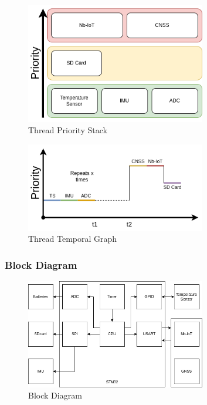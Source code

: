 \begin{figure}[h]
    \centering
    \includegraphics[width=0.7\textwidth]{images/diagrams/threads/thread.drawio.png}  %
    \caption{Thread Priority Stack}
    \label{fig:Thread Priority Stack}        
\end{figure}

\begin{figure}[H]
    \centering
    \includegraphics[width=0.7\textwidth]{images/diagrams/threads/graph/threads_graph.drawio.png}  %
    \caption{Thread Temporal Graph}
    \label{fig:Thread Temporal Graph}        
\end{figure}

\subsubsection{Block Diagram}

\begin{figure}[H]
    \centering
    \includegraphics[width=0.7\textwidth]{images/diagrams/block_diagram/block_diagram_1/block_diagram.drawio.png}  %
    \caption{Block Diagram}
    \label{fig:Block Diagram}        
\end{figure}

